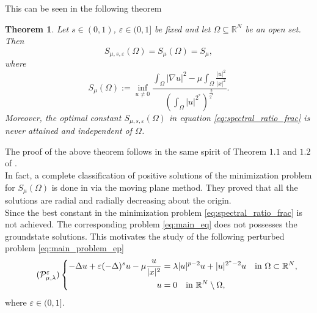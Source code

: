 \documentclass[11pt]{article}
\newtheorem{theorem}{Theorem}[section] %
\newcommand{\om} {\Omega}
\begin{document}
This can be seen in the following theorem
\begin{theorem} Let $s \in (0,1)$, $\varepsilon \in (0,1]$ be fixed and let $\Omega \subseteq \mathbb{R}^N$ be an open set. Then
\begin{equation}\label{eq:best_constant_equality}
S_{\mu, s, \varepsilon}(\Omega) = S_{\mu}(\Omega) = S_{\mu},
\end{equation}
where
\begin{equation*} 
S_{\mu}(\Omega) := \inf_{u \neq 0} 
\frac{\displaystyle\int_{\Omega} |\nabla u|^2 - \mu \int_{\Omega} \frac{|u|^2}{|x|^2}}
{\left(\displaystyle\int_{\Omega} |u|^{2^*} \right)^{\frac{2}{2^*}}}.
\end{equation*}
Moreover, the optimal constant $S_{\mu, s, \varepsilon}(\Omega)$ in equation \eqref{eq:spectral_ratio_frac} is never attained and independent of $\om$.
\end{theorem}
The proof of the above theorem follows in the same spirit of Theorem $1.1$ and $1.2$ of \cite[Theorem $1.1$]{biagi2024mixed_hardy}. \\
In fact, a complete classification of positive solutions of the minimization problem for $S_{\mu}(\om)$ is done in \cite{olivia_classfication_localp} via the moving plane method. They proved that all the solutions are radial and radially decreasing about the origin.\\
Since the best constant in the minimization problem \eqref{eq:spectral_ratio_frac} is not achieved. The corresponding problem \eqref{eq:main_eq} does not possesses the groundstate solutions. This motivates the study of the following perturbed problem \eqref{eq:main_problem_ep}
\begin{equation}\label{eq:main_problem_ep} \tag{$\mathcal{P}_{\mu,\lambda}^{\varepsilon}$}
\left\{
\begin{aligned}
    -\Delta u + \varepsilon(-\Delta)^s u - \mu \frac{u}{|x|^2} &= \lambda |u|^{p-2} u + |u|^{2^*-2} u \quad \text{in } \Omega \subset \mathbb{R}^N, \\
    u &= 0 \quad \text{in } \mathbb{R}^N \setminus \Omega,
\end{aligned}
\right.
\end{equation}
where $\varepsilon \in (0,1]$. \\
\end{document}
